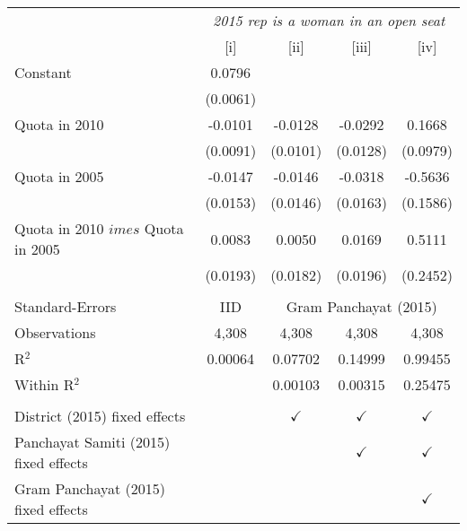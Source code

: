 
\begingroup
\centering
\begin{tabular}{lcccc}
   \toprule
    & \multicolumn{4}{c}{\textit{2015 rep is a woman in an open seat}}\\
                                         & [i]      & [ii]          & [iii]         & [iv]\\  
   \midrule 
   Constant                              & 0.0796   &               &               &   \\   
                                         & (0.0061) &               &               &   \\   
   Quota in 2010                         & -0.0101  & -0.0128       & -0.0292       & 0.1668\\   
                                         & (0.0091) & (0.0101)      & (0.0128)      & (0.0979)\\   
   Quota in 2005                         & -0.0147  & -0.0146       & -0.0318       & -0.5636\\   
                                         & (0.0153) & (0.0146)      & (0.0163)      & (0.1586)\\   
   Quota in 2010 $	imes $ Quota in 2005 & 0.0083   & 0.0050        & 0.0169        & 0.5111\\   
                                         & (0.0193) & (0.0182)      & (0.0196)      & (0.2452)\\   
    \\
   Standard-Errors & IID & \multicolumn{3}{c}{Gram Panchayat (2015)} \\ 
   Observations                          & 4,308    & 4,308         & 4,308         & 4,308\\  
   R$^2$                                 & 0.00064  & 0.07702       & 0.14999       & 0.99455\\  
   Within R$^2$                          &          & 0.00103       & 0.00315       & 0.25475\\  
    \\
   District (2015) fixed effects         &          & $\checkmark$  & $\checkmark$  & $\checkmark$\\   
   Panchayat Samiti (2015) fixed effects &          &               & $\checkmark$  & $\checkmark$\\   
   Gram Panchayat (2015) fixed effects   &          &               &               & $\checkmark$\\   
   \bottomrule
\end{tabular}
\par\endgroup


